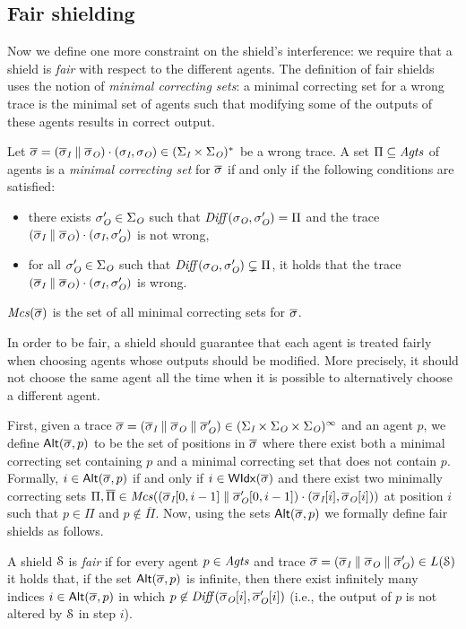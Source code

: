 \subsection{Fair shielding}
Now we define one more constraint on the shield's interference: we require that a shield is \emph{fair} with respect to the different agents.
The definition of fair shields uses the notion of \emph{minimal correcting sets}:
a minimal correcting set for a wrong trace is the minimal set of agents such that modifying some of the outputs of these agents results in correct output.

Let $\overline\sigma  = (\overline\sigma_{\textit{I}}\parallel\overline\sigma_{\textit{O}}) \cdot (\sigma_{\textit{I}},\sigma_{\textit{O}})\in (\Sigma_{\textit{I}} \times \Sigma_{\textit{O}})^*$ be a wrong trace. A set $\Pi \subseteq \mathit{Agts}$ of agents is a \emph{minimal correcting set} for $\overline\sigma$ if and only if the following conditions are satisfied:
\begin{itemize}
\item there exists $\sigma_{\textit{O}}' \in \Sigma_{\textit{O}}$ such that  $\mathit{Diff}(\sigma_{\textit{O}},\sigma_{\textit{O}}') = \Pi$ and the trace $(\overline\sigma_{\textit{I}}\parallel\overline\sigma_{\textit{O}}) \cdot (\sigma_{\textit{I}},\sigma_{\textit{O}}')$ is not wrong,
\item for all $\sigma_{\textit{O}}' \in\Sigma_{\textit{O}}$ such that $\mathit{Diff}(\sigma_{\textit{O}},\sigma_{\textit{O}}') \subsetneq \Pi$, it holds that the trace $(\overline\sigma_{\textit{I}}\parallel\overline\sigma_{\textit{O}}) \cdot (\sigma_{\textit{I}},\sigma_{\textit{O}}')$ is wrong.
\end{itemize}
$\mathit{Mcs}(\overline\sigma)$ is the set of all minimal correcting sets for $\overline\sigma$.

In order to be fair, a shield should guarantee that  each agent is treated fairly when choosing agents whose outputs should be modified. More precisely, it should not choose the same agent  all the time when it is possible to alternatively choose a different agent.

First, given a trace $\overline\sigma = (\overline\sigma_{\textit{I}} \parallel \overline\sigma_{\textit{O}} \parallel \overline\sigma_{\textit{O}}') \in (\Sigma_{\textit{I}} \times \Sigma_{\textit{O}} \times \Sigma_{\textit{O}})^\infty$ and an agent $p$, we define $\mathsf{Alt}(\overline\sigma,p)$ to be the set of positions in $\overline\sigma$ where there exist both a minimal correcting set containing $p$ and a minimal correcting set that does not contain $p$. Formally, $i \in \mathsf{Alt}(\overline\sigma,p)$ if and only if $i \in \mathsf{WIdx}(\overline\sigma)$ and there exist two minimally correcting sets $\Pi ,\overline\Pi\in \mathit{Mcs}((\overline\sigma_{\textit{I}}[0,i-1] \parallel \overline\sigma_{\textit{O}}'[0,i-1])\cdot(\overline\sigma_{\textit{I}}[i],\overline\sigma_{\textit{O}}[i]))$ at position $i$ such that $p \in \Pi$ and $p \not \in \overline\Pi$. Now, using the sets $\mathsf{Alt}(\overline\sigma,p)$ we formally define fair shields as follows.

\begin{defn}\label{defn:fair-shield}
A shield $\mathcal{S}$ is \emph{fair} if for every agent $p \in \mathit{Agts}$ and trace $\overline\sigma = (\overline\sigma_{\textit{I}} \parallel \overline\sigma_{\textit{O}} \parallel \overline\sigma_{\textit{O}}') \in L(\mathcal{S})$ it holds that, if the set $\mathsf{Alt}(\overline\sigma,p)$ is infinite, then there exist infinitely many indices $i \in \mathsf{Alt}(\overline\sigma,p)$ in which $p \not \in \mathit{Diff}(\overline\sigma_{\textit{O}}[i],\overline\sigma_{\textit{O}}'[i])$ (i.e., the output of $p$ is not altered by $\mathcal{S}$ in step $i$).
\end{defn}





